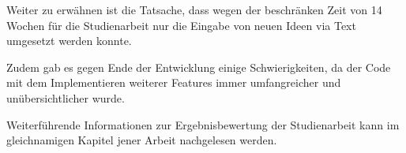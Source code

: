 Weiter zu erwähnen ist die Tatsache, dass wegen der beschränken Zeit von 14 Wochen für die Studienarbeit nur die Eingabe von neuen Ideen via Text umgesetzt werden konnte.

Zudem gab es gegen Ende der Entwicklung einige Schwierigkeiten, da der Code mit dem Implementieren weiterer Features immer umfangreicher und unübersichtlicher wurde.

Weiterführende Informationen zur Ergebnisbewertung der Studienarbeit kann im gleichnamigen Kapitel jener Arbeit \cite{methode635-sa} nachgelesen werden.


\newpage


\newpage


\newpage


\newpage


\newpage


\newpage


\newpage


\newpage

